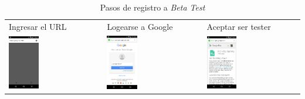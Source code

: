\begin{table}[!h]
\begin{tabular}{lll}
\textsf{\relax 
Ingresar el URL
} & \textsf{\relax 
Logearse a Google
} & \textsf{\relax 
Aceptar ser tester
}\\
    {\includegraphics[width=0.33\textwidth]{anexos/graphics/inst_app.jpg}}
 & 
    {\includegraphics[width=0.33\textwidth]{anexos/graphics/inst_app2.jpg}}
 & 
    {\includegraphics[width=0.33\textwidth]{anexos/graphics/inst_app4.jpg}}
\\
\end{tabular}
\caption{Pasos de registro a \emph{Beta Test}}\label{tab:betatest}
\end{table}


